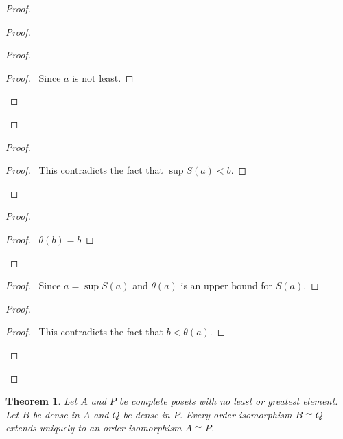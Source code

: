 \documentclass{book}
\let\qed\relax
\newtheorem{thm}[ax]{Theorem}
\theoremstyle{definition}
\begin{document}
\begin{proof}
\pf
{}
\begin{proof}
	\begin{proof}
		\begin{proof}
			\pf\ Since $a$ is not least.
		\end{proof}
	\end{proof}
\end{proof}
\begin{proof}
	\qedstep
	\begin{proof}
		\pf\ This contradicts the fact that $\sup S(a) < b$.
	\end{proof}
\end{proof}
\begin{proof}
	\begin{proof}
		\pf\ $\theta(b) = b$
	\end{proof}
\end{proof}
\begin{proof}
	\pf\ Since $a = \sup S(a)$ and $\theta(a)$ is an upper bound for $S(a)$.
\end{proof}
\begin{proof}
	\qedstep
	\begin{proof}
		\pf\ This contradicts the fact that $b < \theta(a)$.
	\end{proof}
\end{proof}
\qed
\end{proof}

\begin{thm}
\label{thm:extendorderiso}
Let $A$ and $P$ be complete posets with no least or greatest element. Let $B$ be dense in $A$ and $Q$ be dense in $P$. Every order isomorphism $B \cong Q$ extends uniquely to an order isomorphism $A \cong P$.
\end{thm}
\end{document}
